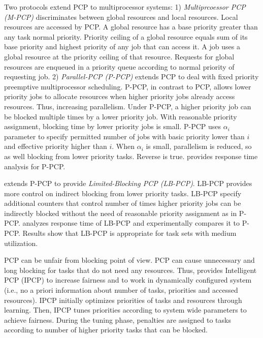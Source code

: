 Two protocols extend PCP to multiprocessor systems: 1) \textit{Multiprcoessor
PCP (M-PCP)} \cite{Rajkumar:1991:SRS:532621,lakshmanan2009coordinated,rajkumar2002real}
discriminates between global resources and local resources. Local
resources are accessed by PCP. A global resource has a base priority
greater than any task normal priority. Priority ceiling of a global
resource equals sum of its base priority and highest priority of any
job that can access it. A job uses a global resource at the priority
ceiling of that resource. Requests for global resources are enqueued
in a priority queue according to normal priority of requesting job.
2) \textit{Parallel-PCP (P-PCP)} \cite{easwaran2009resource} extends
PCP to deal with fixed priority preemptive multiprocessor scheduling.
P-PCP, in contrast to PCP, allows lower priority jobs to allocate
resources when higher priority jobs already access resources. Thus,
increasing parallelism. Under P-PCP, a higher priority job can be
blocked multiple times by a lower priority job. With reasonable priority
assignment, blocking time by lower priority jobs is small. P-PCP uses
$\alpha_{i}$ parameter to specify permitted number of jobs with basic
priority lower than $i$ and effective priority higher than $i$.
When $\alpha_{i}$ is small, parallelism is reduced, so as well blocking
from lower priority tasks. Reverse is true. \cite{easwaran2009resource}
provides response time analysis for P-PCP.

\cite{6001645} extends P-PCP to provide \textit{Limited-Blocking
PCP (LB-PCP)}. LB-PCP provides more control on indirect blocking from
lower priority tasks. LB-PCP specify additional counters that control
number of times higher priority jobs can be indirectly blocked without
the need of reasonable priority assignment as in P-PCP. \cite{6001645}
analyzes response time of LB-PCP and experimentally compares it to
P-PCP. Results show that LB-PCP is appropriate for task sets with
medium utilization.

PCP can be unfair from blocking point of view. PCP can cause unnecessary
and long blocking for tasks that do not need any resources. Thus,
\cite{6031129} provides Intelligent PCP (IPCP) to increase fairness
and to work in dynamically configured system (i.e., no a priori information
about number of tasks, priorities and accessed resources). IPCP initially
optimizes priorities of tasks and resources through learning. Then,
IPCP tunes priorities according to system wide parameters to achieve
fairness. During the tuning phase, penalties are assigned to tasks
according to number of higher priority tasks that can be blocked.


